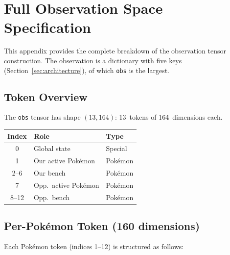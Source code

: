 \chapter{Full Observation Space Specification}
\label{ch:appendix_obs}

This appendix provides the complete breakdown of the observation tensor
construction.  The observation is a dictionary with five keys
(Section~\ref{sec:architecture}), of which \texttt{obs} is the largest.

\section{Token Overview}

The \texttt{obs} tensor has shape $(13, 164)$: 13~tokens of 164~dimensions
each.

\begin{center}
\small
\begin{tabularx}{0.6\textwidth}{c l l}
  \toprule
  \textbf{Index} & \textbf{Role} & \textbf{Type} \\
  \midrule
  0        & Global state        & Special \\
  1        & Our active Pok\'{e}mon  & Pok\'{e}mon \\
  2--6     & Our bench            & Pok\'{e}mon \\
  7        & Opp.\ active Pok\'{e}mon & Pok\'{e}mon \\
  8--12    & Opp.\ bench          & Pok\'{e}mon \\
  \bottomrule
\end{tabularx}
\end{center}

\section{Per-Pok\'{e}mon Token (160 dimensions)}

Each Pok\'{e}mon token (indices 1--12) is structured as follows:

